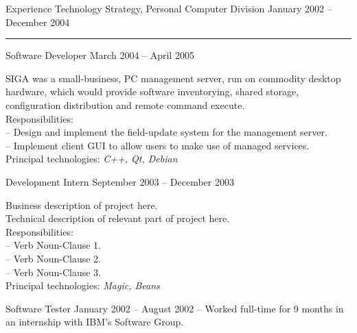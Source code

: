 \documentclass[letterpaper, 11pt]{article}
\begin{document}
\begin{resume}
\begin{category}{Experience}
                     {Technology Strategy, Personal Computer Division} {January 2002 -- December 2004}
            \rule{\textwidth}{1pt}
            \begin{block}
                 {Software Developer}
                         { }                                 {March 2004 -- April 2005}
                \par
                SIGA was a small-business, PC management server, run on commodity desktop
                hardware, which would provide software inventorying, shared storage,
                configuration distribution and remote command execute.
                \\[1ex]
                Responsibilities: \\
                -- Design and implement the field-update system for the management server. \\
                -- Implement client GUI to allow users to make use of managed services.
                \\[1ex]
                Principal technologies: \emph{ C++, Qt, Debian }
                \smallskip
            \end{block}
            \begin{block}
                 {Development Intern}
                         { }                           {September 2003 -- December 2003}
                \par
                Business description of project here.
                \\[1ex]
                Technical description of relevant part of project here.
                \\[1ex]
                Responsibilities: \\
                -- Verb Noun-Clause 1. \\
                -- Verb Noun-Clause 2. \\
                -- Verb Noun-Clause 3.
                \\[1ex]
                Principal technologies: \emph{ Magic, Beans }
                \smallskip
            \end{block}
            \begin{block}
                 {Software Tester}
                         { }                {January 2002 -- August 2002}
                -- Worked full-time for 9 months in an internship with IBM's Software Group.            \\

\end{block}
\end{category}
\end{resume}
\end{document}
